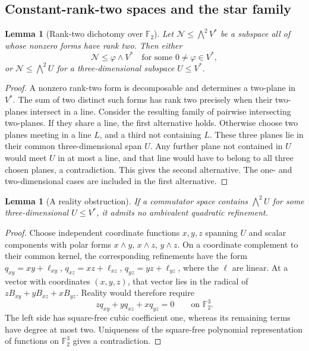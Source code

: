 \documentclass[11pt,a4paper]{amsart}
\newtheorem{lemma}[thm]{Lemma}
\theoremstyle{definition}
\theoremstyle{remark}
\numberwithin{equation}{section}
\begin{document}
\subsection{Constant-rank-two spaces and the star family}

\begin{lemma}[Rank-two dichotomy over $\mathbb F_2$]
\label{lem:rank2-dichotomy-new}
Let $\mathcal N\le\bigwedge^2V^*$ be a subspace all of whose nonzero
forms have rank two. Then either
\[
 \mathcal N\le\varphi\wedge V^*
 \quad\text{for some }0\ne\varphi\in V^*,
\]
or $\mathcal N\le\bigwedge^2U$ for a three-dimensional
subspace $U\le V^*$.
\end{lemma}
\begin{proof}
A nonzero rank-two form is decomposable and determines a two-plane in
$V^*$. The sum of two distinct such forms has rank two precisely when
their two-planes intersect in a line. Consider the resulting family
of pairwise intersecting two-planes. If they share a line, the first
alternative holds. Otherwise choose two planes meeting in a line
$L$, and a third not containing $L$. These three planes lie in their
common three-dimensional span $U$. Any further plane not contained
in $U$ would meet $U$ in at most a line, and that line would have to
belong to all three chosen planes, a contradiction. This gives the
second alternative. The one- and two-dimensional cases are included
in the first alternative.
\end{proof}

\begin{lemma}[A reality obstruction]\label{lem:wedge3-obstruction-new}
If a commutator space contains $\bigwedge^2U$ for some
three-dimensional $U\le V^*$, it admits no ambivalent quadratic
refinement.
\end{lemma}
\begin{proof}
Choose independent coordinate functions $x,y,z$ spanning $U$ and
scalar components with polar forms $x\wedge y$, $x\wedge z$,
$y\wedge z$. On a coordinate complement to their common kernel,
the corresponding refinements have the form
$q_{xy}=xy+\ell_{xy}$, $q_{xz}=xz+\ell_{xz}$,
$q_{yz}=yz+\ell_{yz}$, where the $\ell$ are linear. At a vector
with coordinates $(x,y,z)$, that vector lies in the radical of
$zB_{xy}+yB_{xz}+xB_{yz}$. Reality would therefore require
\[
 zq_{xy}+yq_{xz}+xq_{yz}=0
 \qquad\text{on }\mathbb F_2^3.
\]
The left side has square-free cubic coefficient one, whereas its
remaining terms have degree at most two. Uniqueness of the
square-free polynomial representation of functions on
$\mathbb F_2^3$ gives a contradiction.
\end{proof}
\end{document}
